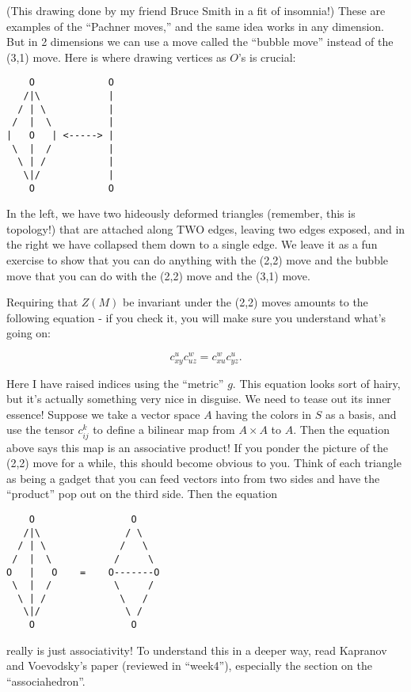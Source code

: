 \documentclass{article}
\begin{document}
(This drawing done by my friend Bruce Smith in a fit of insomnia!) These
are examples of the ``Pachner moves,'' and the same idea works in any
dimension. But in 2 dimensions we can use a move called the ``bubble
move'' instead of the (3,1) move. Here is where drawing vertices as
\(O\)'s is crucial:

\begin{verbatim}
    O             O
   /|\            |
  / | \           |
 /  |  \          |
|   O   | <-----> |
 \  |  /          |
  \ | /           |
   \|/            |
    O             O
\end{verbatim}

In the left, we have two hideously deformed triangles (remember, this is
topology!) that are attached along TWO edges, leaving two edges exposed,
and in the right we have collapsed them down to a single edge. We leave
it as a fun exercise to show that you can do anything with the (2,2)
move and the bubble move that you can do with the (2,2) move and the
(3,1) move.

Requiring that \(Z(M)\) be invariant under the (2,2) moves amounts to
the following equation - if you check it, you will make sure you
understand what's going on:

\[c_{xy}^u c_{uz}^w = c_{xu}^w c_{yz}^u.\]

Here I have raised indices using the ``metric'' \(g\). This equation
looks sort of hairy, but it's actually something very nice in disguise.
We need to tease out its inner essence! Suppose we take a vector space
\(A\) having the colors in \(S\) as a basis, and use the tensor
\(c_{ij}^k\) to define a bilinear map from \(A \times A\) to \(A\). Then
the equation above says this map is an associative product! If you
ponder the picture of the (2,2) move for a while, this should become
obvious to you. Think of each triangle as being a gadget that you can
feed vectors into from two sides and have the ``product'' pop out on the
third side. Then the equation

\begin{verbatim}
    O                 O
   /|\               / \    
  / | \             /   \  
 /  |  \           /     \ 
O   |   O    =    O-------O
 \  |  /           \     /   
  \ | /             \   /          
   \|/               \ /     
    O                 O
\end{verbatim}

really is just associativity! To understand this in a deeper way, read
Kapranov and Voevodsky's paper (reviewed in ``week4''), especially the
section on the ``associahedron''.
\end{document}
